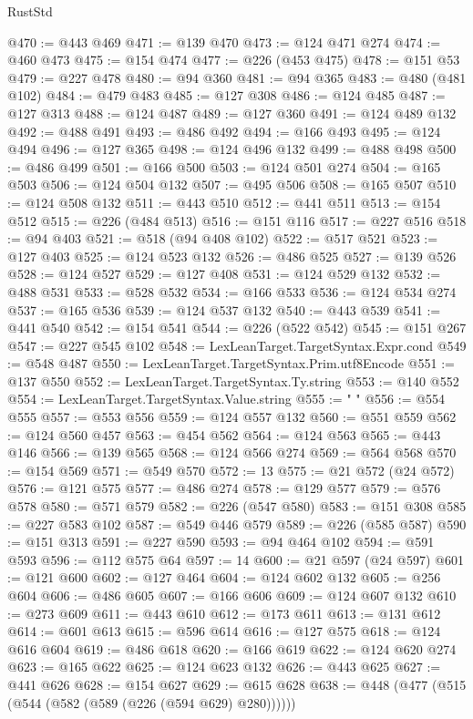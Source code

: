 \begin{lexlean}{RustStd}
\begin{coremodule}
@470 := @443 @469
@471 := @139 @470
@473 := @124 @471 @274
@474 := @460 @473
@475 := @154 @474
@477 := @226 (@453 @475)
@478 := @151 @53
@479 := @227 @478
@480 := @94 @360
@481 := @94 @365
@483 := @480 (@481 @102)
@484 := @479 @483
@485 := @127 @308
@486 := @124 @485
@487 := @127 @313
@488 := @124 @487
@489 := @127 @360
@491 := @124 @489 @132
@492 := @488 @491
@493 := @486 @492
@494 := @166 @493
@495 := @124 @494
@496 := @127 @365
@498 := @124 @496 @132
@499 := @488 @498
@500 := @486 @499
@501 := @166 @500
@503 := @124 @501 @274
@504 := @165 @503
@506 := @124 @504 @132
@507 := @495 @506
@508 := @165 @507
@510 := @124 @508 @132
@511 := @443 @510
@512 := @441 @511
@513 := @154 @512
@515 := @226 (@484 @513)
@516 := @151 @116
@517 := @227 @516
@518 := @94 @403
@521 := @518 (@94 @408 @102)
@522 := @517 @521
@523 := @127 @403
@525 := @124 @523 @132
@526 := @486 @525
@527 := @139 @526
@528 := @124 @527
@529 := @127 @408
@531 := @124 @529 @132
@532 := @488 @531
@533 := @528 @532
@534 := @166 @533
@536 := @124 @534 @274
@537 := @165 @536
@539 := @124 @537 @132
@540 := @443 @539
@541 := @441 @540
@542 := @154 @541
@544 := @226 (@522 @542)
@545 := @151 @267
@547 := @227 @545 @102
@548 := LexLeanTarget.TargetSyntax.Expr.cond
@549 := @548 @487
@550 := LexLeanTarget.TargetSyntax.Prim.utf8Encode
@551 := @137 @550
@552 := LexLeanTarget.TargetSyntax.Ty.string
@553 := @140 @552
@554 := LexLeanTarget.TargetSyntax.Value.string
@555 := " "
@556 := @554 @555
@557 := @553 @556
@559 := @124 @557 @132
@560 := @551 @559
@562 := @124 @560 @457
@563 := @454 @562
@564 := @124 @563
@565 := @443 @146
@566 := @139 @565
@568 := @124 @566 @274
@569 := @564 @568
@570 := @154 @569
@571 := @549 @570
@572 := 13
@575 := @21 @572 (@24 @572)
@576 := @121 @575
@577 := @486 @274
@578 := @129 @577
@579 := @576 @578
@580 := @571 @579
@582 := @226 (@547 @580)
@583 := @151 @308
@585 := @227 @583 @102
@587 := @549 @446 @579
@589 := @226 (@585 @587)
@590 := @151 @313
@591 := @227 @590
@593 := @94 @464 @102
@594 := @591 @593
@596 := @112 @575 @64
@597 := 14
@600 := @21 @597 (@24 @597)
@601 := @121 @600
@602 := @127 @464
@604 := @124 @602 @132
@605 := @256 @604
@606 := @486 @605
@607 := @166 @606
@609 := @124 @607 @132
@610 := @273 @609
@611 := @443 @610
@612 := @173 @611
@613 := @131 @612
@614 := @601 @613
@615 := @596 @614
@616 := @127 @575
@618 := @124 @616 @604
@619 := @486 @618
@620 := @166 @619
@622 := @124 @620 @274
@623 := @165 @622
@625 := @124 @623 @132
@626 := @443 @625
@627 := @441 @626
@628 := @154 @627
@629 := @615 @628
@638 := @448 (@477 (@515 (@544 (@582 (@589 (@226 (@594 @629) @280))))))

\end{coremodule}
\end{lexlean}
